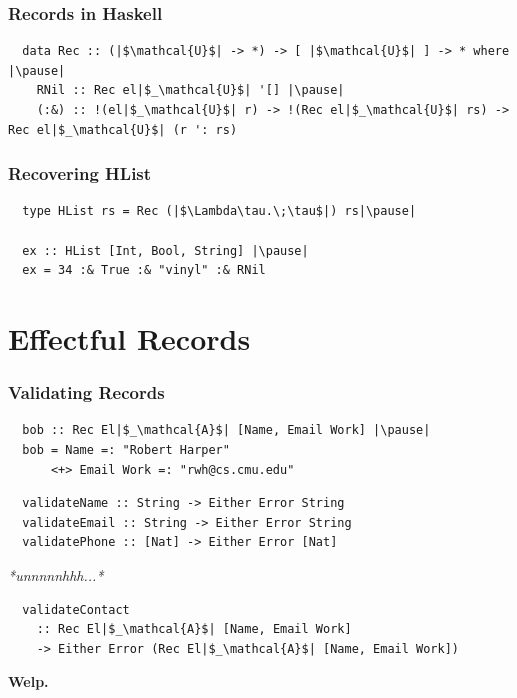 \documentclass[12pt]{beamer}
\begin{document}
\begin{frame}[fragile]
  \frametitle{Records in Haskell}
  \begin{lstlisting}
  data Rec :: (|$\mathcal{U}$| -> *) -> [ |$\mathcal{U}$| ] -> * where |\pause|
    RNil :: Rec el|$_\mathcal{U}$| '[] |\pause|
    (:&) :: !(el|$_\mathcal{U}$| r) -> !(Rec el|$_\mathcal{U}$| rs) -> Rec el|$_\mathcal{U}$| (r ': rs)
  \end{lstlisting}
\end{frame}

\begin{frame}[fragile]
  \frametitle{Recovering HList}\pause
  \begin{lstlisting}
  type HList rs = Rec (|$\Lambda\tau.\;\tau$|) rs|\pause|

  ex :: HList [Int, Bool, String] |\pause|
  ex = 34 :& True :& "vinyl" :& RNil
  \end{lstlisting}
\end{frame}

\section{Effectful Records}

\begin{frame}[fragile]
  \frametitle{Validating Records}

  \begin{lstlisting}
  bob :: Rec El|$_\mathcal{A}$| [Name, Email Work] |\pause|
  bob = Name =: "Robert Harper"
      <+> Email Work =: "rwh@cs.cmu.edu"
  \end{lstlisting}
  \pause
  \begin{lstlisting}
  validateName :: String -> Either Error String
  validateEmail :: String -> Either Error String
  validatePhone :: [Nat] -> Either Error [Nat]
  \end{lstlisting}
  \pause
  \centerline{\textit{*unnnnnhhh...*}}
  \pause
  \begin{lstlisting}
  validateContact
    :: Rec El|$_\mathcal{A}$| [Name, Email Work]
    -> Either Error (Rec El|$_\mathcal{A}$| [Name, Email Work])
  \end{lstlisting}
\end{frame}
\begin{frame}
  \centerline{\textbf{Welp.}}
\end{frame}
\end{document}
